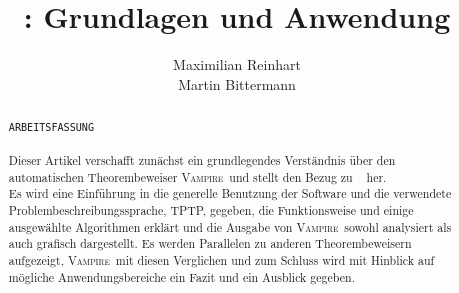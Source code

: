 \documentclass{article}
\author{
	Maximilian Reinhart\\
	Martin Bittermann
}
\title{\vampire: Grundlagen und Anwendung}
\newcommand{\vampire}{\textsc{Vampire}~}
\begin{document}
\maketitle

\begin{abstract}
	\texttt{ARBEITSFASSUNG}\\
	\\
	Dieser Artikel verschafft zunächst ein grundlegendes Verständnis über den automatischen Theorembeweiser \vampire und
	stellt den Bezug zu ~\cite{cav2013} her. \\
	Es wird eine Einführung in die generelle Benutzung der Software und die verwendete Problembeschreibungssprache, TPTP, gegeben, 
	die Funktionsweise und einige ausgewählte Algorithmen erklärt und
	die Ausgabe von \vampire sowohl analysiert als auch grafisch dargestellt.
	Es werden Parallelen zu anderen Theorembeweisern aufgezeigt, \vampire mit diesen Verglichen 
	und zum Schluss wird mit Hinblick auf mögliche Anwendungsbereiche ein Fazit und ein Ausblick gegeben.
\end{abstract}


\end{document}
